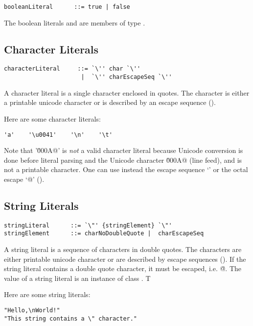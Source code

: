 \syntax\begin{lstlisting}
booleanLiteral      ::= true | false
\end{lstlisting}

The boolean literals \lstinline@true@ and \lstinline@false@ are
members of type \lstinline@boolean@.

\subsection{Character Literals}

\syntax\begin{lstlisting}
characterLiteral     ::= `\'' char `\''
                      |  `\'' charEscapeSeq `\''
\end{lstlisting}

A character literal is a single character enclosed in quotes.
The character is either a printable unicode character or is described
by an escape sequence ().

\example
Here are some character literals:
\begin{lstlisting}
'a'    '\u0041'    '\n'    '\t'
\end{lstlisting}
Note that '\lstinline@\u000A@' is {\em not} a valid character literal because
Unicode conversion is done before literal parsing and the Unicode
character \lstinline@\u000A@ (line feed), and is not a printable
character. One can use instead the escape sequence `\lstinline@\n@' or
the octal escape `\lstinline@{}@' ().

\subsection{String Literals}

\syntax\begin{lstlisting}
stringLiteral      ::= `\"' {stringElement} `\"'
stringElement      ::= charNoDoubleQuote |  charEscapeSeq
\end{lstlisting}

A string literal is a sequence of characters in double quotes.  The
characters are either printable unicode character or are described by
escape sequences (). If the string literal
contains a double quote character, it must be escaped,
i.e. \lstinline@\"@. The value of a string literal is an instance of
class \lstinline@String@. T

\example
Here are some string literals:
\begin{lstlisting}
"Hello,\nWorld!"       
"This string contains a \" character."
\end{lstlisting}

